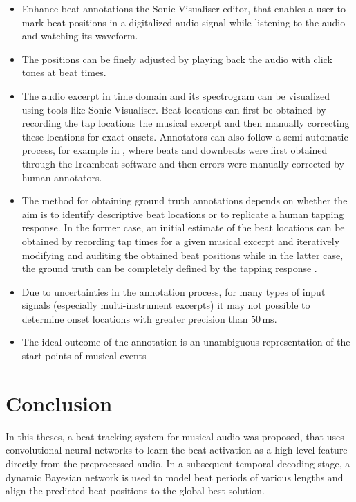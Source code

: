 \documentclass{scrartcl}
\begin{document}
\begin{itemize}
\item Enhance beat annotations the Sonic Visualiser \cite{SonicVisualiser} editor, that enables a user to mark beat positions in a digitalized audio signal while listening to the audio and watching its waveform.
\item The positions can be finely adjusted by playing back the audio with click tones at beat times.
\item The audio excerpt in time domain and its spectrogram can be visualized using tools like Sonic Visualiser. Beat locations can first be obtained by recording the tap locations the musical excerpt and then manually correcting these locations for exact onsets.  Annotators can also follow a semi-automatic process, for example in \cite{Peeters2010}, where beats and downbeats were first obtained through the Ircambeat software and then errors were manually corrected by human annotators.
\item The method for obtaining ground truth annotations depends on whether the aim is to identify descriptive beat locations or to replicate a human tapping response. In the former case, an initial estimate of the beat locations can be obtained by recording tap times for a given musical excerpt and iteratively modifying and auditing the obtained beat positions while in the latter case, the ground truth can be completely defined by the tapping response \cite{Davies2009b}.
 \item Due to uncertainties in the annotation process, for many types of input signals (especially multi-instrument excerpts) it may not possible to determine onset locations with greater precision than $50\,\text{ms}$. \cite{Leveau2004}
\item The ideal outcome of the annotation is an unambiguous representation of the start points of musical events
\end{itemize}


\newpage 

\section{Conclusion}
\label{sec:conclusion}


In this theses, a beat tracking system for musical audio was proposed, that uses convolutional neural networks to learn the beat activation as a high-level feature directly from the preprocessed audio. In a subsequent temporal decoding stage, a dynamic Bayesian network is used to model beat periods of various lengths and align the predicted beat positions to the global best solution.
\end{document}
